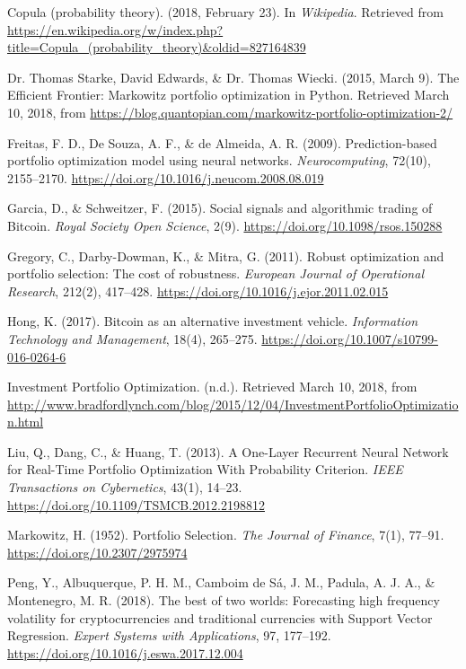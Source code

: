 \documentclass[11pt]{article} %
\begin{document}
 \begin{hangparas}{.25in}{1}


Copula (probability theory). (2018, February 23). In \emph{Wikipedia}. Retrieved from
\url{ https://en.wikipedia.org/w/index.php?title=Copula_(probability_theory)&oldid=827164839}

Dr. Thomas Starke, David Edwards, \& Dr. Thomas Wiecki. (2015, March 9). The Efficient Frontier: Markowitz portfolio optimization in Python. Retrieved March 10, 2018, from \url{https://blog.quantopian.com/markowitz-portfolio-optimization-2/}

Freitas, F. D., De Souza, A. F., \& de Almeida, A. R. (2009). Prediction-based portfolio optimization model using neural networks. \emph{Neurocomputing}, 72(10), 2155–2170. \url{https://doi.org/10.1016/j.neucom.2008.08.019}

Garcia, D., \& Schweitzer, F. (2015). Social signals and algorithmic trading of Bitcoin. \emph{Royal Society Open Science}, 2(9). \url{https://doi.org/10.1098/rsos.150288}

Gregory, C., Darby-Dowman, K., \& Mitra, G. (2011). Robust optimization and portfolio selection: The cost of robustness. \emph{European Journal of Operational Research}, 212(2), 417–428. \url{https://doi.org/10.1016/j.ejor.2011.02.015}

Hong, K. (2017). Bitcoin as an alternative investment vehicle. \emph{Information Technology and Management}, 18(4), 265–275. \url{https://doi.org/10.1007/s10799-016-0264-6}

Investment Portfolio Optimization. (n.d.). Retrieved March 10, 2018, from \url{http://www.bradfordlynch.com/blog/2015/12/04/InvestmentPortfolioOptimization.html}

Liu, Q., Dang, C., \& Huang, T. (2013). A One-Layer Recurrent Neural Network for Real-Time Portfolio Optimization With Probability Criterion. \emph{IEEE Transactions on Cybernetics}, 43(1), 14–23. \url{https://doi.org/10.1109/TSMCB.2012.2198812}

Markowitz, H. (1952). Portfolio Selection. \emph{The Journal of Finance}, 7(1), 77–91. \url{https://doi.org/10.2307/2975974}

Peng, Y., Albuquerque, P. H. M., Camboim de Sá, J. M., Padula, A. J. A., \& Montenegro, M. R. (2018). The best of two worlds: Forecasting high frequency volatility for cryptocurrencies and traditional currencies with Support Vector Regression. \emph{Expert Systems with Applications}, 97, 177–192. \url{https://doi.org/10.1016/j.eswa.2017.12.004}


\end{hangparas}
\end{document}

